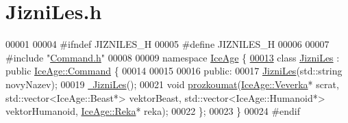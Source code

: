 \hypertarget{JizniLes_8h_source}{}\section{Jizni\+Les.\+h}
\label{JizniLes_8h_source}

\begin{DoxyCode}
00001 
00004 \textcolor{preprocessor}{#ifndef JIZNILES\_H}
00005 \textcolor{preprocessor}{#define JIZNILES\_H}
00006 
00007 \textcolor{preprocessor}{#include "\hyperlink{Command_8h}{Command.h}"}
00008 
00009 \textcolor{keyword}{namespace }\hyperlink{namespaceIceAge}{IceAge} \{
\hypertarget{JizniLes_8h_source.tex_l00013}{}\hyperlink{classIceAge_1_1JizniLes}{00013}     \textcolor{keyword}{class }\hyperlink{classIceAge_1_1JizniLes}{JizniLes} : \textcolor{keyword}{public} \hyperlink{classIceAge_1_1Command}{IceAge::Command} \{
00014 
00015 
00016     \textcolor{keyword}{public}:
00017         \hyperlink{classIceAge_1_1JizniLes_a79d20a1e507be9604e9a7b4a1d4068b0}{JizniLes}(std::string novyNazev);
00019         \hyperlink{classIceAge_1_1JizniLes_a4dbe10f16bfc6806095c30544c9a530e}{~JizniLes}();
00021         \textcolor{keywordtype}{void} \hyperlink{classIceAge_1_1JizniLes_aa0b6a38d4a469a83cef58d6fd9d53430}{prozkoumat}(\hyperlink{classIceAge_1_1Veverka}{IceAge::Veverka}* scrat, std::vector<IceAge::Beast*> 
      vektorBeast, std::vector<IceAge::Humanoid*> vektorHumanoid, \hyperlink{classIceAge_1_1Reka}{IceAge::Reka}* reka);
00022     \};
00023 \}
00024 \textcolor{preprocessor}{#endif}
\end{DoxyCode}
